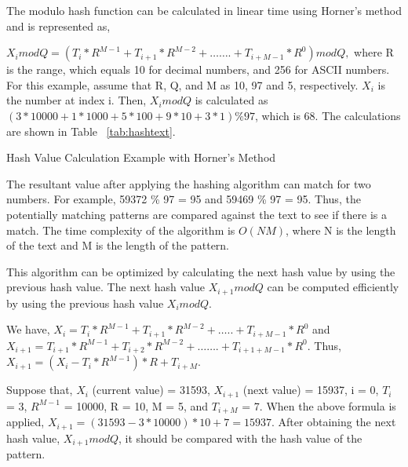 The modulo hash function can be calculated in linear time using Horner's method \cite{bib29} and is represented as,

$X_i mod Q = (T_i*R^{M-1} + T_{i+1}*R^{M-2} + …….+ T_{i+M-1}* R^0) mod Q,$ 
where R is the range, which equals 10 for decimal numbers, and 256 for ASCII numbers. For this example, assume that R, Q, and M as 10, 97 and 5, respectively. $X_i$ is the number at index i. Then, $X_i mod Q$ is calculated as $(3 * 10000 + 1 * 1000 + 5 * 100 + 9 *10 + 3*1) \% 97$, which is 68. The calculations are shown in Table ~\ref{tab:hashtext}.

\begin {table}[H]
\caption {Hash Value Calculation Example with Horner's Method} \label{tab:hashtext}
\end {table}
\squeezeup

The resultant value after applying the hashing algorithm can match for two numbers.
For example, 59372 \% 97 = 95 and 59469 \% 97 = 95. Thus, the potentially matching patterns are compared against the text to see if there is a match. The time complexity of the algorithm is $O(NM)$, where N is the length of the text and M is the length of the pattern.

This algorithm can be optimized by calculating the next hash value by using the previous hash value. The next hash value $X_{i+1} mod Q$ can be computed efficiently by using the previous hash value $X_i mod Q$. 

We have, $X_i = T_i*R^{M-1} + T_{i+1} * R^{M-2} + …..+ T_{i+M-1} * R^0 $ and $X_{i+1} = T_{i+1}*R^{M-1} + T_{i+2} * R^{M-2} +…….+ T_{i+1+M-1}*R^0.$ Thus, $X_{i+1} =  (X_i - T_i*R^{M-1}) * R  + T_{i+M}.$ 


Suppose that, $X_i$ (current value) = 31593, $X_{i+1}$ (next value) = 15937, i = 0, $T_i$ = 3, $R^{M-1}$ = 10000, R = 10, M = 5, and $T_{i+M}$ = 7. When the above formula is applied, $X_{i+1} = (31593 - 3*10000)*10 + 7 = 15937.$ After obtaining the next hash value, $X_{i+1} mod Q$, it should be compared with the hash value of the pattern.

